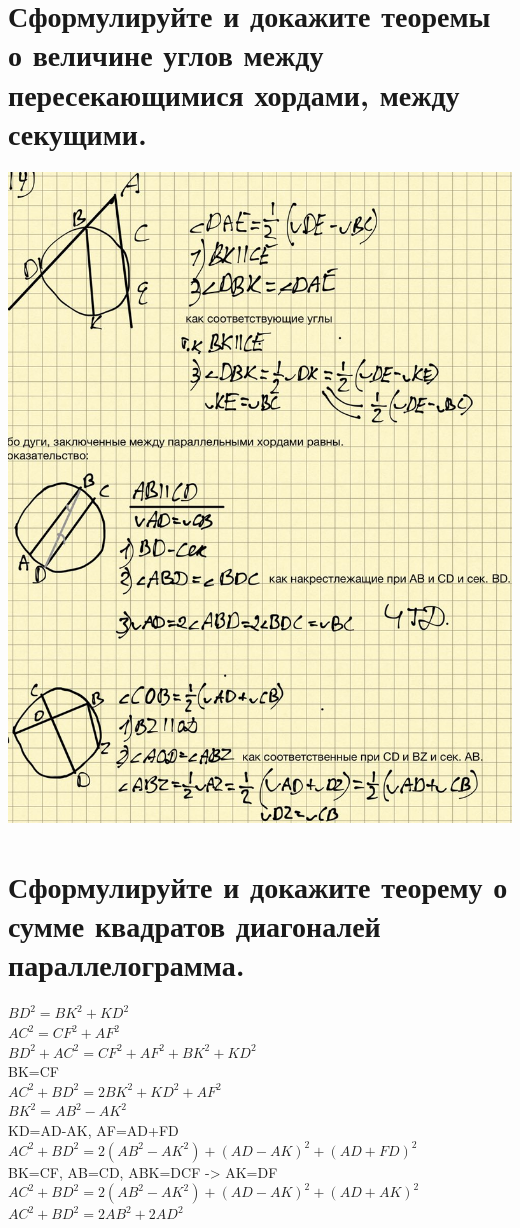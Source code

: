 \documentclass[12pt, letterpaper]{article}
\begin{document}
\section {Сформулируйте и докажите теоремы о величине углов между пересекающимися хордами, между секущими.}
\includegraphics[scale=0.3]{asset.jpg} \\


\section {Сформулируйте и докажите теорему о сумме квадратов диагоналей параллелограмма.}
$BD^2=BK^2+KD^2 $ \\
$AC^2=CF^2+AF^2$ \\
$BD^2+AC^2=CF^2+AF^2+BK^2+KD^2$ \\
BK=CF\\
$AC^2+BD^2=2BK^2+KD^2+AF^2$\\
$BK^2=AB^2-AK^2$\\
KD=AD-AK, AF=AD+FD \\
$AC^2+BD^2=2(AB^2-AK^2)+(AD-AK)^2+(AD+FD)^2$\\
BK=CF, AB=CD, ABK=DCF -> AK=DF\\
$AC^2+BD^2=2(AB^2-AK^2)+(AD-AK)^2+(AD+AK)^2$\\
$AC^2+BD^2=2AB^2+2AD^2$\\
\end{document}
